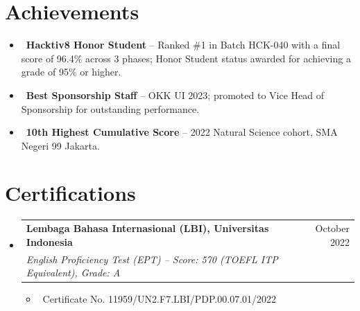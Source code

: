 \documentclass[letterpaper,10pt]{article}
\makeatletter
\newcommand{\resumeItem}[1]{\item\small{#1}}
\newcommand{\resumeSubheading}[4]{
\vspace{-1pt}\item
  \begin{tabular*}{0.97\textwidth}[t]{l@{\extracolsep{\fill}}r}
    \textbf{#1} & #2 \\
    \textit{#3} & \textit{#4} \\
  \end{tabular*}\vspace{-7pt}
}
\newcommand{\resumeSubHeadingList}{\begin{itemize}[leftmargin=0.15in, label={}]}
\newcommand{\resumeSubHeadingListEnd}{\end{itemize}}
\makeatother
\begin{document}
\section{Achievements}
\resumeSubHeadingList
  \resumeItem{\textbullet\ \textbf{Hacktiv8 Honor Student} -- Ranked \#1 in Batch HCK-040 with a final score of 96.4\% across 3 phases; Honor Student status awarded for achieving a grade of 95\% or higher.}
  \resumeItem{\textbullet\ \textbf{Best Sponsorship Staff} -- OKK UI 2023; promoted to Vice Head of Sponsorship for outstanding performance.}
  \resumeItem{\textbullet\ \textbf{10th Highest Cumulative Score} -- 2022 Natural Science cohort, SMA Negeri 99 Jakarta.}
\resumeSubHeadingListEnd

\section{Certifications}
\resumeSubHeadingList
  \resumeSubheading
      {Lembaga Bahasa Internasional (LBI), Universitas Indonesia}{October 2022}
      {English Proficiency Test (EPT) -- Score: 570 (TOEFL ITP Equivalent), Grade: A}{}
      \resumeSubHeadingList
          \resumeItem{\textbullet\ Certificate No. 11959/UN2.F7.LBI/PDP.00.07.01/2022}
      \resumeSubHeadingListEnd
\resumeSubHeadingListEnd
\end{document}
